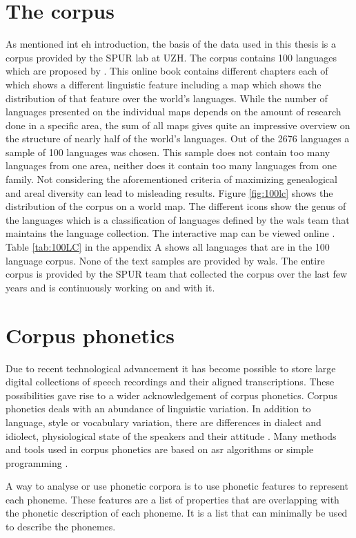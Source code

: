 \section{The corpus}
\label{corpus}
As mentioned int eh introduction, the basis of the data used in this thesis is a corpus provided by the SPUR lab at UZH. The corpus contains 100 languages which are proposed by \citet{Comrie&Dryer.2013}. This online book contains different chapters each of which shows a different linguistic feature including a map which shows the distribution of that feature over the world's languages. While the number of languages presented on the individual maps depends on the amount of research done in a specific area, the sum of all maps gives quite an impressive overview on the structure of nearly half of the world's languages. Out of the 2676 languages a sample of 100 languages was chosen. This sample does not contain too many languages from one area, neither does it contain too many languages from one family. Not considering the aforementioned criteria of maximizing genealogical and areal diversity can lead to misleading results. Figure \ref{fig:100lc} shows the distribution of the corpus on a world map. The different icons show the genus of the languages which is a classification of languages defined by the \ac{wals} team that maintains the language collection. The interactive map can be viewed online \citep{100LC.21.07.2021}. Table \ref{tab:100LC} in the appendix A shows all languages that are in the 100 language corpus. None of the text samples are provided by \ac{wals}. The entire corpus is provided by the SPUR team that collected the corpus over the last few years and is continuously working on and with it.










\section{Corpus phonetics}
Due to recent technological advancement it has become possible to store large digital collections of speech recordings and their aligned transcriptions. These possibilities gave rise to a wider acknowledgement of corpus phonetics. Corpus phonetics deals with an abundance of linguistic variation. In addition to language, style or vocabulary variation, there are differences in dialect and idiolect, physiological state of the speakers and their attitude \citep{Liberman.2019, Chodroff.19.07.2019}. Many methods and tools used in corpus phonetics are based on \ac{asr} algorithms or simple programming \citep{Chodroff.19.07.2019}.

A way to analyse or use phonetic corpora is to use phonetic features to represent each phoneme. These features are a list of properties that are overlapping with the phonetic description of each phoneme. It is a list that can minimally be used to describe the phonemes. 

